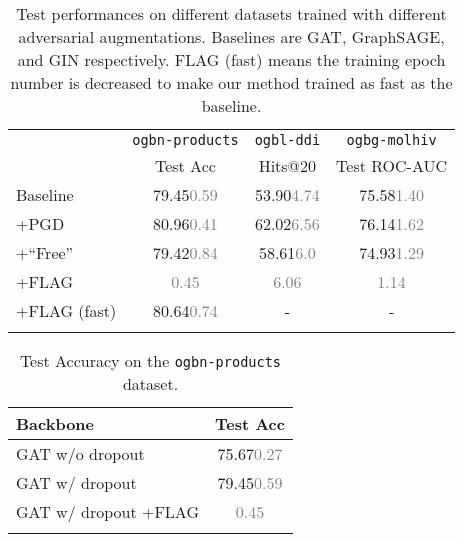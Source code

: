 \documentclass[11pt]{article}
\newcommand{\bftab}{\fontseries{b}\selectfont}
\begin{document}
\begin{table}[t] \centering 

\caption{Test performances on different datasets trained with different adversarial augmentations. Baselines are GAT, GraphSAGE, and GIN respectively. FLAG (fast) means the training epoch number is decreased to make our method trained as fast as the baseline.}

\begin{tabular}{lccc}
\Xhline{2\arrayrulewidth}
   & \texttt{ogbn-products} & \texttt{ogbl-ddi} & \texttt{ogbg-molhiv}\\
 	& Test Acc & Hits@20  & Test ROC-AUC  \\
\hline\hline
Baseline & 79.45\textcolor{gray}{ {0.59}} &  53.90\textcolor{gray}{ {4.74}} & 75.58\textcolor{gray}{ {1.40}} \\
+PGD & 80.96\textcolor{gray}{ {0.41}} & 62.02\textcolor{gray}{ {6.56}}  & 76.14\textcolor{gray}{ {1.62}} \\
+``Free''  & 79.42\textcolor{gray}{ {0.84}} & 58.61\textcolor{gray}{ {6.0}} &  74.93\textcolor{gray}{ {1.29}} \\
\hline
+FLAG  & \bftab81.76\textcolor{gray}{ {0.45}} & \bftab63.31\textcolor{gray}{ {6.06}} & \bftab76.54\textcolor{gray}{ {1.14}} \\
+FLAG (fast)  & 80.64\textcolor{gray}{ {0.74}} & - & - \\

\Xhline{2\arrayrulewidth}
\end{tabular}

\label{tab:adv}
\end{table} \begin{table}[t]  \centering
\caption{Test Accuracy on the \texttt{ogbn-products} dataset.}
\begin{tabular}{lc}
\Xhline{2\arrayrulewidth}
Backbone	& Test Acc  \\
\hline\hline
GAT w/o dropout & 75.67\textcolor{gray}{ {0.27}} \\
GAT w/ dropout & 79.45\textcolor{gray}{ {0.59}}\\
GAT w/ dropout +FLAG  & \bftab81.76\textcolor{gray}{ {0.45}}\\
\Xhline{2\arrayrulewidth}
\end{tabular}


\end{table}
\end{document}
